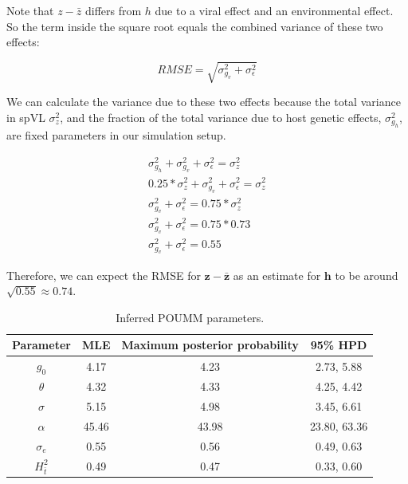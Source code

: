 \documentclass[]{article}
\begin{document}
\begin{doublespace}
Note that $z - \bar{z}$ differs from $h$ due to a viral effect and an environmental effect. So the term inside the square root equals the combined variance of these two effects:

\begin{equation}
    RMSE = \sqrt{\sigma^2_{g_v} + \sigma^2_\epsilon}
\end{equation}

We can calculate the variance due to these two effects because the total variance in spVL $\sigma^2_z$, and the fraction of the total variance due to host genetic effects, $\sigma^2_{g_h}$, are fixed parameters in our simulation setup.

\begin{equation}
\begin{split}
    \sigma^2_{g_h} + \sigma^2_{g_v} + \sigma^2_\epsilon = \sigma^2_z \\
    0.25 * \sigma^2_{z} + \sigma^2_{g_v} + \sigma^2_\epsilon = \sigma^2_z \\
    \sigma^2_{g_v} + \sigma^2_\epsilon = 0.75 * \sigma^2_z \\
    \sigma^2_{g_v} + \sigma^2_\epsilon = 0.75 * 0.73 \\
    \sigma^2_{g_v} + \sigma^2_\epsilon = 0.55
\end{split}
\end{equation}

Therefore, we can expect the RMSE for $\bm{z} - \bm{\bar{z}}$ as an estimate for $\bm{h}$ to be around $\sqrt{0.55} \approx 0.74$. 


\begin{table}[H]
	\begin{center}
		\begin{tabular}{cccc} \hline 
			Parameter & MLE & Maximum posterior probability & 95\% HPD \\ \hline 
			${g_{0}}$ & 4.17 & 4.23 & 2.73, 5.88 \\
			$\theta$ & 4.32 & 4.33 & 4.25, 4.42 \\
			$\sigma$ & 5.15 & 4.98 & 3.45, 6.61 \\
			$\alpha$ & 45.46 & 43.98 & 23.80, 63.36 \\
			$\sigma_e$ & 0.55 & 0.56 & 0.49, 0.63 \\ 
			$H^2_{\bar{t}}$ & 0.49 & 0.47 & 0.33, 0.60 \\ \hline
		\end{tabular}
		\caption{Inferred POUMM parameters.}
		\label{tab:POUMM-parameters}
	\end{center}
\end{table}


\end{doublespace}
\end{document}
